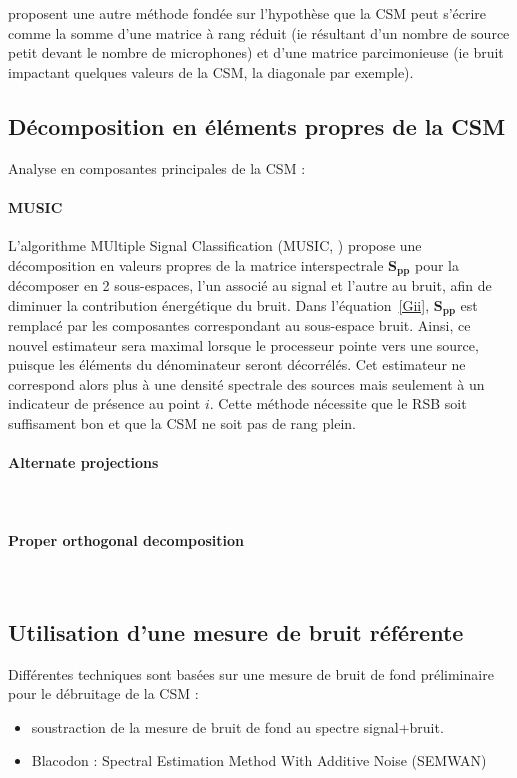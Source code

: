 \cite{finez:hal-01276687} proposent une autre méthode fondée sur l'hypothèse que la CSM peut s'écrire comme la somme d'une matrice à rang réduit (ie résultant d'un nombre de source petit devant le nombre de microphones) et d'une matrice parcimonieuse (ie bruit impactant quelques valeurs de la CSM, la diagonale par exemple).

\subsection{Décomposition en éléments propres de la CSM}
Analyse en composantes principales de la CSM : 
\paragraph{\tbullet MUSIC} L'algorithme MUltiple Signal Classification (MUSIC, \cite{Schmidt1986}) propose une décomposition en valeurs propres de la matrice interspectrale $\bm{S_{pp}}$ pour la décomposer en 2 sous-espaces, l’un associé au signal et l’autre au bruit, afin de diminuer la contribution énergétique du bruit.  Dans l'équation~\ref{Gii}, $\bm{S_{pp}}$ est remplacé par les composantes correspondant au sous-espace bruit. Ainsi, ce nouvel estimateur sera maximal lorsque le processeur pointe vers une source, puisque les éléments du dénominateur seront décorrélés. Cet estimateur ne correspond alors plus à une densité spectrale des sources mais seulement à un indicateur de présence au point $i$. Cette méthode nécessite que le RSB soit suffisament bon et que la CSM ne soit pas de rang plein.\\

\paragraph{\tbullet Alternate projections}\\

\paragraph{\tbullet  Proper orthogonal decomposition}\\


\subsection{Utilisation d'une mesure de bruit référente}
Différentes techniques sont basées sur une mesure de bruit de fond préliminaire pour le débruitage de la CSM : 
\begin{itemize}
	\item soustraction de la mesure de bruit de fond au spectre signal+bruit.
	\item Blacodon : Spectral Estimation Method With Additive Noise (SEMWAN)
\end{itemize}

